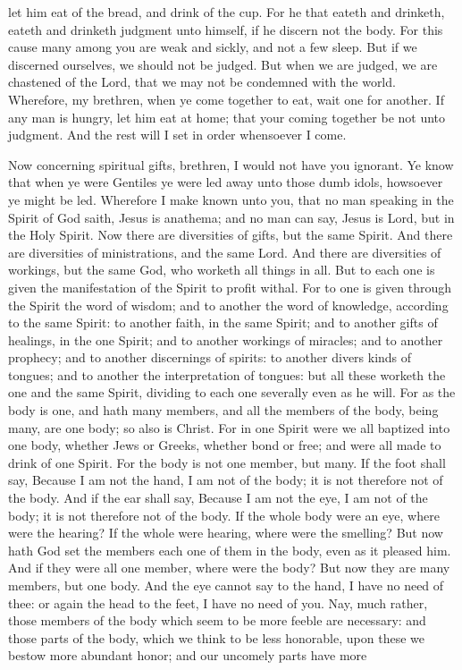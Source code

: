 let him eat of the bread, and drink of the cup. For he that eateth and drinketh, eateth and drinketh judgment unto himself, if he discern not the body. For this cause many among you are weak and sickly, and not a few sleep. But if we discerned ourselves, we should not be judged. But when we are judged, we are chastened of the Lord, that we may not be condemned with the world. Wherefore, my brethren, when ye come together to eat, wait one for another. If any man is hungry, let him eat at home; that your coming together be not unto judgment. And the rest will I set in order whensoever I come. 

Now concerning spiritual gifts, brethren, I would not have you ignorant. Ye know that when ye were Gentiles ye were led away unto those dumb idols, howsoever ye might be led. Wherefore I make known unto you, that no man speaking in the Spirit of God saith, Jesus is anathema; and no man can say, Jesus is Lord, but in the Holy Spirit.  Now there are diversities of gifts, but the same Spirit. And there are diversities of ministrations, and the same Lord. And there are diversities of workings, but the same God, who worketh all things in all. But to each one is given the manifestation of the Spirit to profit withal. For to one is given through the Spirit the word of wisdom; and to another the word of knowledge, according to the same Spirit: to another faith, in the same Spirit; and to another gifts of healings, in the one Spirit; and to another workings of miracles; and to another prophecy; and to another discernings of spirits: to another divers kinds of tongues; and to another the interpretation of tongues: but all these worketh the one and the same Spirit, dividing to each one severally even as he will.  For as the body is one, and hath many members, and all the members of the body, being many, are one body; so also is Christ. For in one Spirit were we all baptized into one body, whether Jews or Greeks, whether bond or free; and were all made to drink of one Spirit. For the body is not one member, but many. If the foot shall say, Because I am not the hand, I am not of the body; it is not therefore not of the body. And if the ear shall say, Because I am not the eye, I am not of the body; it is not therefore not of the body. If the whole body were an eye, where were the hearing? If the whole were hearing, where were the smelling? But now hath God set the members each one of them in the body, even as it pleased him. And if they were all one member, where were the body? But now they are many members, but one body. And the eye cannot say to the hand, I have no need of thee: or again the head to the feet, I have no need of you. Nay, much rather, those members of the body which seem to be more feeble are necessary: and those parts of the body, which we think to be less honorable, upon these we bestow more abundant honor; and our uncomely parts have more 